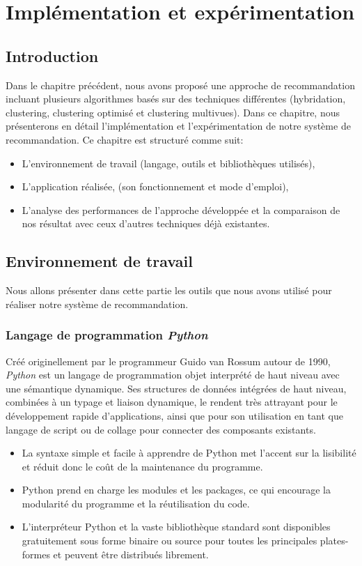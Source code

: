 \chapter{Implémentation et expérimentation }
\thispagestyle{empty}
\newpage
\section{Introduction}
Dans le chapitre précédent, nous avons proposé une approche de recommandation incluant plusieurs algorithmes basés sur des techniques différentes (hybridation, clustering, clustering optimisé et clustering multivues). 
Dans ce chapitre, nous présenterons en détail l'implémentation et l'expérimentation de notre système de recommandation.
Ce chapitre est structuré comme suit:
\begin{itemize}
	\item L'environnement de travail (langage, outils et bibliothèques utilisés),
	\item L’application réalisée, (son fonctionnement et mode d’emploi),
	\item L'analyse des performances de l’approche développée et la comparaison de nos résultat avec ceux d’autres techniques déjà existantes.
\end{itemize}

\section{Environnement de travail}
Nous allons présenter dans cette partie les outils que nous avons utilisé pour réaliser notre système de recommandation.
\subsection{Langage de programmation \textit{Python}}
Créé originellement par le programmeur Guido van Rossum autour de 1990, \textit{Python} est un langage de programmation objet interprété de haut niveau avec une sémantique dynamique. Ses structures de données intégrées de haut niveau, combinées à un typage et liaison dynamique, le rendent très attrayant pour le développement rapide d'applications, ainsi que pour son utilisation en tant que langage de script ou de collage pour connecter des composants existants\cite{ref39}.


\begin{itemize}
	\item La syntaxe simple et facile à apprendre de Python met l'accent sur la lisibilité et réduit donc le coût de la maintenance du programme. 
	\item Python prend en charge les modules et les packages, ce qui encourage la modularité du programme et la réutilisation du code. 
	\item L'interpréteur Python et la vaste bibliothèque standard sont disponibles gratuitement sous forme binaire ou source pour toutes les principales plates-formes et peuvent être distribués librement.
\end{itemize}

